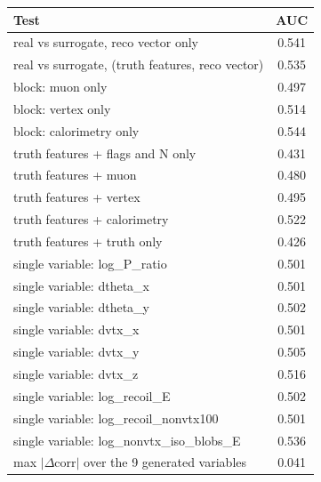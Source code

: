\begin{tabular}{lc}
\toprule
Test & AUC \\
\midrule
real vs surrogate, reco vector only & 0.541 \\
real vs surrogate, (truth features, reco vector) & 0.535 \\
\midrule
block: muon only & 0.497 \\
block: vertex only & 0.514 \\
block: calorimetry only & 0.544 \\
truth features + flags and N only & 0.431 \\
truth features + muon & 0.480 \\
truth features + vertex & 0.495 \\
truth features + calorimetry & 0.522 \\
truth features + truth only & 0.426 \\
single variable: log\_P\_ratio & 0.501 \\
single variable: dtheta\_x & 0.501 \\
single variable: dtheta\_y & 0.502 \\
single variable: dvtx\_x & 0.501 \\
single variable: dvtx\_y & 0.505 \\
single variable: dvtx\_z & 0.516 \\
single variable: log\_recoil\_E & 0.502 \\
single variable: log\_recoil\_nonvtx100 & 0.501 \\
single variable: log\_nonvtx\_iso\_blobs\_E & 0.536 \\
\midrule
max $|\Delta$corr$|$ over the 9 generated variables & 0.041 \\
\bottomrule
\end{tabular}
